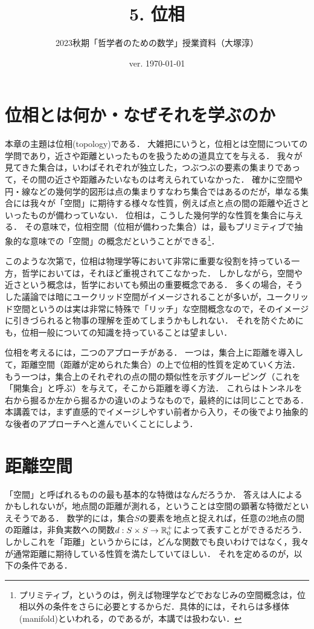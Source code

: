 \documentclass[11pt,a4paper, dvipdfmx]{jsarticle}
\begin{document}
\title{5. 位相}
\author{2023秋期「哲学者のための数学」授業資料（大塚淳）}
\date{ver. \today}
\maketitle

\section{位相とは何か・なぜそれを学ぶのか}

本章の主題は位相(topology)である．
大雑把にいうと，位相とは空間についての学問であり，近さや距離といったものを扱うための道具立てを与える．
我々が見てきた集合は，いわばそれぞれが独立した，つぶつぶの要素の集まりであって，その間の近さや距離みたいなものは考えられていなかった．
確かに空間や円・線などの幾何学的図形は点の集まりすなわち集合ではあるのだが，単なる集合には我々が「空間」に期待する様々な性質，例えば点と点の間の距離や近さといったものが備わっていない．
位相は，こうした幾何学的な性質を集合に与える．
その意味で，位相空間（位相が備わった集合）は，最もプリミティブで抽象的な意味での「空間」の概念だということができる\footnote{プリミティブ，というのは，例えば物理学などでおなじみの空間概念は，位相以外の条件をさらに必要とするからだ．具体的には，それらは多様体(manifold)といわれる，のであるが，本講では扱わない．}．

このような次第で，位相は物理学等において非常に重要な役割を持っている一方，哲学においては，それほど重視されてこなかった．
しかしながら，空間や近さという概念は，哲学においても頻出の重要概念である．
多くの場合，そうした議論では暗にユークリッド空間がイメージされることが多いが，ユークリッド空間というのは実は非常に特殊で「リッチ」な空間概念なので，そのイメージに引きづられると物事の理解を歪めてしまうかもしれない．
それを防ぐためにも，位相一般についての知識を持っていることは望ましい．

位相を考えるには，二つのアプローチがある．
一つは，集合上に距離を導入して，距離空間（距離が定められた集合）の上で位相的性質を定めていく方法．
もう一つは，集合上のそれぞれの点の間の類似性を示すグルーピング（これを「開集合」と呼ぶ）を与えて，そこから距離を導く方法．
これらはトンネルを右から掘るか左から掘るかの違いのようなもので，最終的には同じことである．
本講義では，まず直感的でイメージしやすい前者から入り，その後でより抽象的な後者のアプローチへと進んでいくことにしよう．


\section{距離空間}
「空間」と呼ばれるものの最も基本的な特徴はなんだろうか．
答えは人によるかもしれないが，地点間の距離が測れる，ということは空間の顕著な特徴だといえそうである．
数学的には，集合$S$の要素を地点と捉えれば，任意の2地点の間の距離は，非負実数への関数$d:S \times S \to \mathbb{R}^+_0$によって表すことができるだろう．
しかしこれを「距離」というからには，どんな関数でも良いわけではなく，我々が通常距離に期待している性質を満たしていてほしい．
それを定めるのが，以下の条件である．
\end{document}
